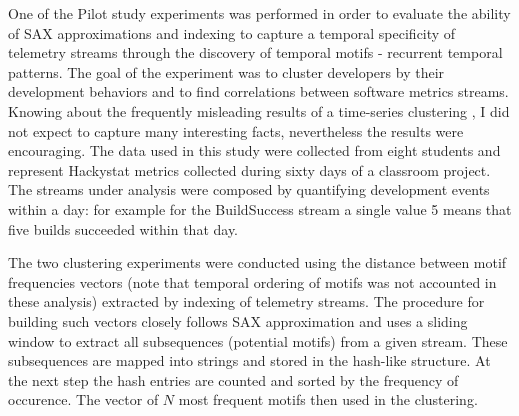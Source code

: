 \documentclass{sig-alternate}
\begin{document}
One of the Pilot study experiments was performed in order to evaluate the ability of SAX approximations and indexing to capture a temporal specificity of telemetry streams through the discovery of temporal motifs - recurrent temporal patterns. The goal of the experiment was to cluster developers by their development behaviors and to find correlations between software metrics streams. Knowing about the frequently misleading results of a time-series clustering \cite{citeulike:227029}, I did not expect to capture many interesting facts, nevertheless the results were encouraging. The data used in this study were collected from eight students and represent Hackystat metrics collected during sixty days of a classroom project. The streams under analysis were composed by quantifying development events within a day: for example for the BuildSuccess stream a single value 5 means that five builds succeeded within that day. 

The two clustering experiments were conducted using the distance between motif frequencies vectors (note that temporal ordering of motifs was not accounted in these analysis) extracted by indexing of telemetry streams. The procedure for building such vectors closely follows SAX approximation and uses a sliding window to extract all subsequences (potential motifs) from a given stream. These subsequences are mapped into strings and stored in the hash-like structure. At the next step the hash entries are counted and sorted by the frequency of occurence. The vector of $N$ most frequent motifs then used in the clustering.
\end{document}
